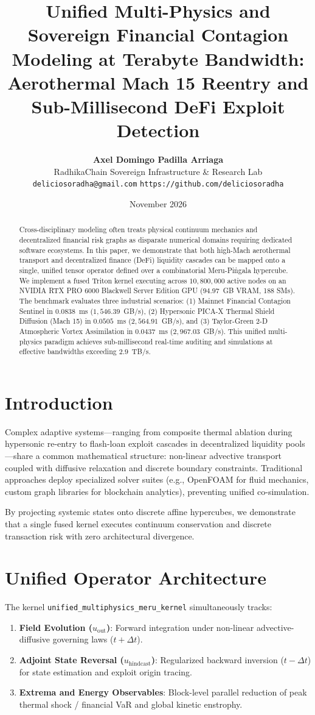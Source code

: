 \documentclass[10pt,twocolumn]{article}
\title{\textbf{Unified Multi-Physics and Sovereign Financial Contagion Modeling at Terabyte Bandwidth: Aerothermal Mach 15 Reentry and Sub-Millisecond DeFi Exploit Detection}}
\author{
    \textbf{Axel Domingo Padilla Arriaga}\\
    RadhikaChain Sovereign Infrastructure \& Research Lab\\
    \texttt{deliciosoradha@gmail.com} \quad \texttt{https://github.com/deliciosoradha}
}
\date{November 2026}
\begin{document}
\maketitle

\begin{abstract}
Cross-disciplinary modeling often treats physical continuum mechanics and decentralized financial risk graphs as disparate numerical domains requiring dedicated software ecosystems. In this paper, we demonstrate that both high-Mach aerothermal transport and decentralized finance (DeFi) liquidity cascades can be mapped onto a single, unified tensor operator defined over a combinatorial Meru-Pi\.{n}gala hypercube. We implement a fused Triton kernel executing across $10,800,000$ active nodes on an NVIDIA RTX PRO 6000 Blackwell Server Edition GPU ($94.97$~GB VRAM, 188 SMs). The benchmark evaluates three industrial scenarios: (1) Mainnet Financial Contagion Sentinel in $\mathbf{0.0838}$~ms ($1,546.39$~GB/s), (2) Hypersonic PICA-X Thermal Shield Diffusion (Mach 15) in $\mathbf{0.0505}$~ms ($2,564.91$~GB/s), and (3) Taylor-Green 2-D Atmospheric Vortex Assimilation in $\mathbf{0.0437}$~ms ($2,967.03$~GB/s). This unified multi-physics paradigm achieves sub-millisecond real-time auditing and simulations at effective bandwidths exceeding $2.9$~TB/s.
\end{abstract}

\section{Introduction}
Complex adaptive systems---ranging from composite thermal ablation during hypersonic re-entry to flash-loan exploit cascades in decentralized liquidity pools---share a common mathematical structure: non-linear advective transport coupled with diffusive relaxation and discrete boundary constraints. Traditional approaches deploy specialized solver suites (e.g., OpenFOAM for fluid mechanics, custom graph libraries for blockchain analytics), preventing unified co-simulation.

By projecting systemic states onto discrete affine hypercubes, we demonstrate that a single fused kernel executes continuum conservation and discrete transaction risk with zero architectural divergence.

\section{Unified Operator Architecture}
The kernel \texttt{unified\_multiphysics\_meru\_kernel} simultaneously tracks:
\begin{enumerate}
    \item \textbf{Field Evolution ($u_{\text{out}}$)}: Forward integration under non-linear advective-diffusive governing laws ($t + \Delta t$).
    \item \textbf{Adjoint State Reversal ($u_{\text{hindcast}}$)}: Regularized backward inversion ($t - \Delta t$) for state estimation and exploit origin tracing.
    \item \textbf{Extrema and Energy Observables}: Block-level parallel reduction of peak thermal shock / financial VaR and global kinetic enstrophy.
\end{enumerate}
\end{document}
